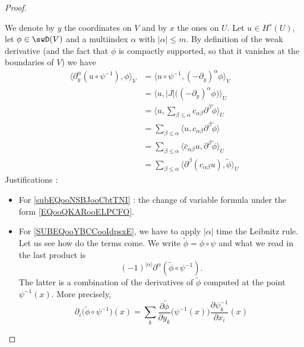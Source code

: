 \begin{proof}
\begin{subproof}
        We denote by \( y\) the coordinates on \( V\) and by \( x\) the ones on \( U\). Let \( u\in H^s(U)\), let \( \phi\in\swD(V)\) and a multiindex \( \alpha\) with \( | \alpha |\leq m\). By definition of the weak derivative (and the fact that \( \phi\) is compactly supported, so that it vanishes at the boundaries of \( V\)) we have
        \begin{subequations}
            \begin{align}
                    \langle \partial_y^{\alpha}(u\circ\psi^{-1}), \phi\rangle_V&=\langle u\circ\psi^{-1}, (-\partial_y)^{\alpha}\phi\rangle_V\\
                    &=\langle u, | J |\big( (-\partial_y)^{\alpha}\phi \big)\rangle_U     \label{subEQooNSBJooCbtTNI} \\
                    &=\langle u, \sum_{\beta\leq \alpha}c_{\alpha\beta}\partial^{\beta}\tilde \phi\rangle_U \label{SUBEQooYBCCooIdpsxE}     \\
                    &=\sum_{\beta\leq \alpha}\langle u, c_{\alpha\beta}\partial^{\beta}\tilde\phi\rangle \\
                    &=\sum_{\beta\leq \alpha}\langle \bar c_{\alpha\beta}u, \partial^{\beta}\tilde \phi\rangle_U\\
                    &=\sum_{\beta\leq \alpha}\langle \partial^{\beta}(c_{\alpha\beta}u), \tilde \phi\rangle_U       \label{SUBEQooCSHLooTdTHvf}
            \end{align}
        \end{subequations}
        Justifications :
        \begin{itemize}
            \item 
                For \eqref{subEQooNSBJooCbtTNI} : the change of variable formula under the form \eqref{EQooQKARooELPCFO}.
            \item
                For \eqref{SUBEQooYBCCooIdpsxE}, we have to apply \( | \alpha |\) time the Leibnitz rule. Let us see how do the terms come. We write \( \tilde \phi=\phi\circ\psi\) and what we read in the last product is
        \begin{equation}
            (-1)^{| \alpha |}\partial^{\alpha}(\tilde \phi\circ\psi^{-1}).
        \end{equation}
        The latter is a combination of the derivatives of \( \tilde \phi\) computed at the point \( \psi^{-1}(x)\). More precisely,
        \begin{equation}
            \partial_i\big( \tilde \phi\circ\psi^{-1} \big)(x)=\sum_k\frac{ \partial \tilde \phi }{ \partial y_k }\big( \psi^{-1}(x) \big)\frac{ \partial \psi^{-1}_k }{ \partial x_i }(x)

\end{equation}
\end{itemize}
\end{subproof}
\end{proof}
